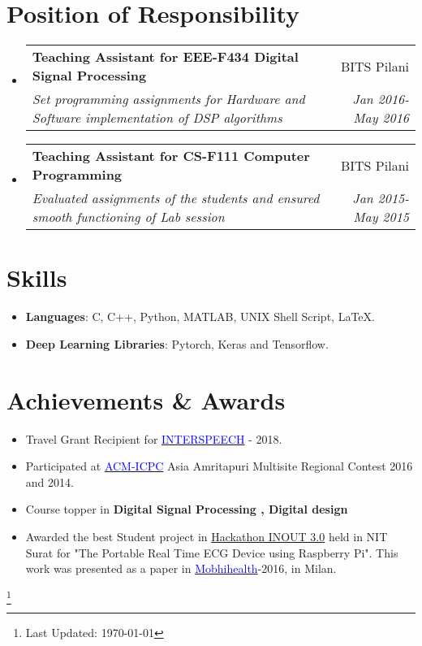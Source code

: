 \documentclass[letterpaper,10.5pt]{article}
\makeatletter
\newcommand{\resumeSubheading}[4]{
  \vspace{-1pt}\item
    \begin{tabular*}{0.97\textwidth}{l@{\extracolsep{\fill}}r}
      \textbf{#1} & #2 \\
      \textit{\small#3} & \textit{\small #4} \\
    \end{tabular*}\vspace{-4pt}
}
\newcommand{\resumeSubHeadingListStart}{\begin{itemize}[leftmargin=*]}
\newcommand{\resumeSubHeadingListEnd}{\end{itemize}}
\makeatother
\begin{document}

\section{Position of Responsibility}

\resumeSubHeadingListStart
\resumeSubheading
      {Teaching Assistant for EEE-F434 Digital Signal Processing}{BITS Pilani}
      {Set programming assignments for Hardware and Software implementation
of DSP algorithms}{Jan 2016-May 2016}
      \resumeSubheading
      {Teaching Assistant for CS-F111 Computer Programming}{BITS Pilani}
      {Evaluated assignments of the students and ensured smooth functioning of
Lab session}{Jan 2015-May 2015}
\resumeSubHeadingListEnd





\section{Skills}
\begin{itemize}
\item \textbf{Languages}: C, C++, Python, MATLAB, UNIX Shell Script, \LaTeX.
\item \textbf{Deep Learning Libraries}: Pytorch, Keras and Tensorflow.
\end{itemize}
\section{Achievements \& Awards}
\begin{itemize}
\item Travel Grant Recipient for \href{https://interspeech2018.org/}{\textcolor{blue}{INTERSPEECH}} - 2018. 
\item Participated at \href{https://icpc.baylor.edu/ICPCID/QDI825ZM40CC}{\textcolor{blue}{ACM-ICPC}} Asia Amritapuri Multisite Regional Contest 2016 and 2014.
\item Course topper in \textbf{Digital Signal Processing , Digital design}
\item Awarded the best Student project in \href{https://hackinout.co/}{Hackathon INOUT 3.0} held in NIT Surat for "The Portable Real Time ECG Device using Raspberry Pi". This work was presented as a paper in \href{http://archive.mobihealth.name/2016/show/home}{\textcolor{blue}{Mobhihealth}}-2016, in Milan.

\end{itemize}
\footnote{Last Updated: \today}
\end{document}
